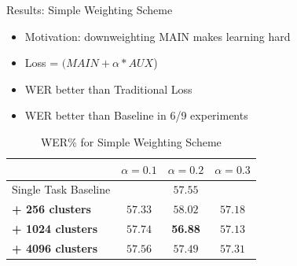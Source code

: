 \documentclass[final]{beamer} %
\begin{document}
\begin{frame}
\begin{columns}
\begin{column}{0.3\textwidth}
{          \vfill
          
        
        \begin{block}{\boxnumber Results: Simple Weighting Scheme}
          \begin{itemize}
          \item Motivation: downweighting MAIN makes learning hard
          \item Loss = $(MAIN + \alpha*AUX$)
          \item WER better than Traditional Loss
          \item WER better than Baseline in 6/9 experiments
          \end{itemize}
        \end{block}        

        \vfill
        
        
        \begin{table}[!htbp]
          \centering
          \caption{WER\% for Simple Weighting Scheme}
          \begin{adjustbox}{width=\textwidth}
            \begin{tabular}{lccc}
              \toprule
              & $\alpha = 0.1 $ & $\alpha = 0.2 $ & $\alpha = 0.3 $\\
              \midrule
              Single Task Baseline  &  \multicolumn{3}{c}{$57.55$ \raisebox{.33\height}{\footnotesize{$\pm 1.82$}}}     \\
              
              \textbf{+ 256 clusters}  &  $57.33$ \raisebox{.33\height}{\footnotesize{$\pm 2.49$}}   &  $58.02$ \raisebox{.33\height}{\footnotesize{$\pm 2.09$}}     & $57.18$ \raisebox{.33\height}{\footnotesize{$\pm 0.56$}} \\
              
              \textbf{+ 1024 clusters}   & $ 57.74$ \raisebox{.33\height}{\footnotesize{$\pm 3.06$}}    & \textbf{56.88}  \raisebox{.33\height}{\footnotesize{$\pm 1.33$}}    & $57.13  $ \raisebox{.33\height}{\footnotesize{$\pm 1.55$}}  \\
              
              \textbf{+ 4096 clusters}   &  $57.56$ \raisebox{.33\height}{\footnotesize{$\pm 2.53$}}  & $57.49$ \raisebox{.33\height}{\footnotesize{$\pm  3.17$}}   &  $57.31$ \raisebox{.33\height}{\footnotesize{$\pm 1.31$}}  \\
              \bottomrule
            \end{tabular}
          \end{adjustbox}
        \end{table}
        
}
\end{column}
\end{columns}
\end{frame}
\end{document}
